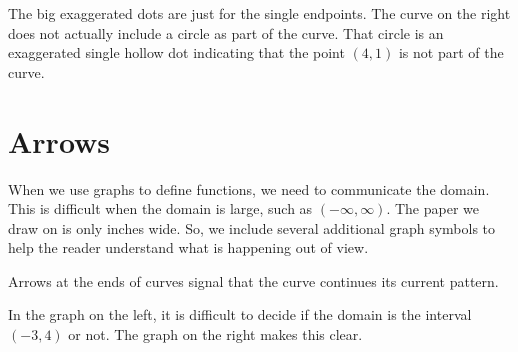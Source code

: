 \documentclass{ximera}
\begin{document}
The big exaggerated dots are just for the single endpoints.  The curve on the right does not actually include a circle as part of the curve. That circle is an exaggerated single hollow dot indicating that the point $(4, 1)$ is not part of the curve.







\section{Arrows}


When we use graphs to define functions, we need to communicate the domain. This is difficult when the domain is large, such as $(-\infty, \infty)$. The paper we draw on is only inches wide.  So, we include several additional graph symbols to help the reader understand what is happening out of view.

Arrows at the ends of curves signal that the curve continues its current pattern.


In the graph on the left, it is difficult to decide if the domain is the interval $(-3, 4)$ or not.  The graph on the right makes this clear.

\begin{image}
\end{image}
\end{document}
